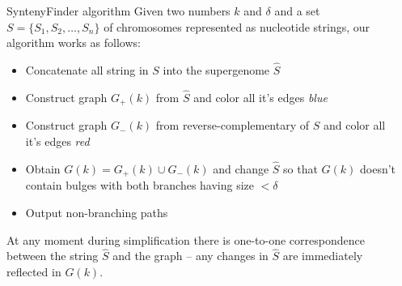 \documentclass[final,hyperref={pdfpagelabels=false}]{beamer}
\begin{document}
\begin{frame}{}
\begin{columns}[t]
\begin{column}{0.32\linewidth}
\end{column}

\begin{column}{0.32\linewidth}

\begin{block}{SyntenyFinder algorithm} \justifying
Given two numbers \(k\) and \(\delta\) and a set \(S = \lbrace S_{1}, S_{2}, \ldots, S_{n} \rbrace \) of chromosomes 
represented as nucleotide strings, our algorithm works as follows:
\begin{itemize}
\item Concatenate all string in \(S\) into the supergenome \(\hat{S}\)
\item Construct graph \(G_+(k)\) from \(\hat{S}\) and color all it's edges \textit{blue}
\item Construct graph \(G_-(k)\) from reverse-complementary of \(\hat{S}\) and color all it's edges \textit{red}
\item Obtain \(G(k) = G_+(k) \cup G_-(k)\) and change \(\hat{S}\) so that \(G(k)\) doesn't contain bulges with both branches having size \( < \delta \)
\item Output non-branching paths
\end{itemize}
At any moment during simplification there is one-to-one correspondence between the string \(\hat{S}\) and the graph -- any changes in \(\hat{S}\) are immediately reflected in \(G(k)\).
\end{block}


\end{column}
\end{columns}
\end{frame}
\end{document}
